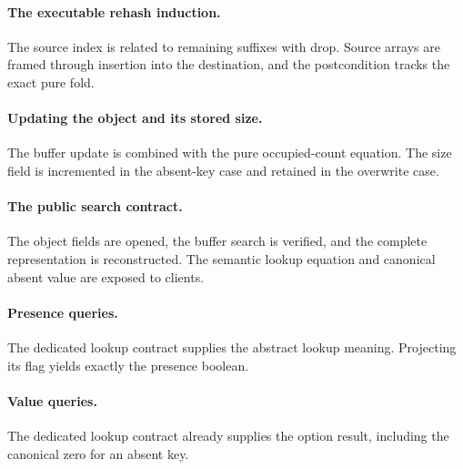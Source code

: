 \documentclass[11pt]{article}
\begin{document}


\paragraph{The executable rehash induction.} The source index is related to remaining suffixes with drop. Source arrays are framed through insertion into the destination, and the postcondition tracks the exact pure fold.



\paragraph{Updating the object and its stored size.} The buffer update is combined with the pure occupied-count equation. The size field is incremented in the absent-key case and retained in the overwrite case.



\paragraph{The public search contract.} The object fields are opened, the buffer search is verified, and the complete representation is reconstructed. The semantic lookup equation and canonical absent value are exposed to clients.



\paragraph{Presence queries.} The dedicated lookup contract supplies the abstract lookup meaning. Projecting its flag yields exactly the presence boolean.



\paragraph{Value queries.} The dedicated lookup contract already supplies the option result, including the canonical zero for an absent key.


\end{document}
